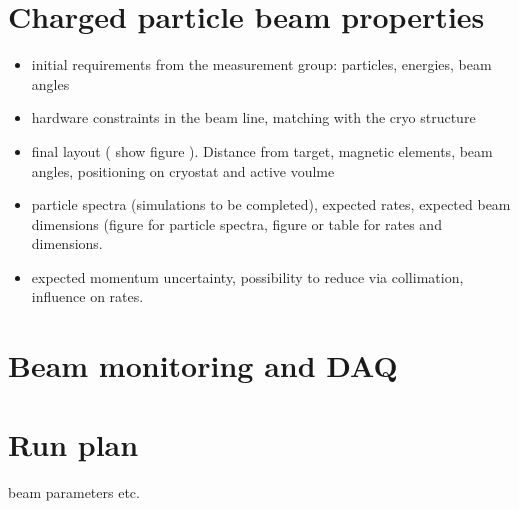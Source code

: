 
\section{Charged particle beam properties}
\begin{itemize}
\item initial requirements from the measurement group: particles, energies, beam angles
\item hardware constraints in the beam line, matching with the cryo structure
\item final layout ( show figure ). Distance from target, magnetic elements, beam angles, positioning on cryostat and active voulme
\item particle spectra (simulations to be completed),  expected rates, expected beam dimensions (figure for particle spectra, figure or table for rates and dimensions. 
\item expected momentum uncertainty, possibility to reduce via collimation, influence on rates.  
\end{itemize}
\section{Beam monitoring and DAQ}


\section{Run plan}

beam parameters etc.
